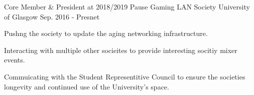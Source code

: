 

\begin{cventries}

  \cventry
    {Core Member \& President at 2018/2019} %
    {Pause Gaming LAN Society} %
    {University of Glasgow} %
    {Sep. 2016 - Presnet} %
    {
      \begin{cvitems} %
        \item {Pushng the society to update the aging networking infrastructure.}
        \item {Interacting with multiple other socieites to provide interesting socitiy mixer events.}
	\item {Commuicating with the Student Representitive Council to ensure the societies longevity and continued use of the University's space.}
      \end{cvitems}
    }

\end{cventries}

